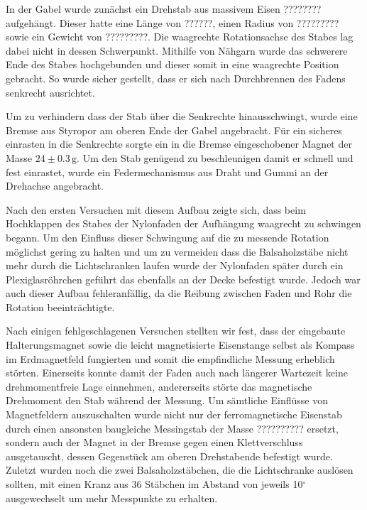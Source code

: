 \documentclass[11pt]{scrartcl}
\newcommand{\unit}[1]{\ensuremath{\,\mathrm{#1}}} %
\begin{document}
In der Gabel wurde zun\"achst ein Drehstab aus massivem Eisen ???????? aufgeh\"angt. Dieser hatte eine L\"ange von ??????, einen Radius von ????????? sowie ein Gewicht von ?????????. Die waagrechte Rotationsachse des Stabes lag dabei nicht in dessen Schwerpunkt. Mithilfe von N\"ahgarn wurde das schwerere Ende des Stabes hochgebunden und dieser somit in eine waagrechte Position gebracht. So wurde sicher gestellt, dass er sich nach Durchbrennen des Fadens senkrecht ausrichtet.

Um zu verhindern dass der Stab \"uber die Senkrechte hinausschwingt, wurde eine Bremse aus Styropor am oberen Ende der Gabel angebracht. F\"ur ein sicheres einrasten in die Senkrechte sorgte ein in die Bremse eingeschobener Magnet der Masse $24 \pm 0.3\unit{g}$. Um den Stab gen\"ugend zu beschleunigen damit er schnell und fest einrastet, wurde ein Federmechanismus aus Draht und Gummi an der Drehachse angebracht. %
%

Nach den ersten Versuchen mit diesem Aufbau zeigte sich, dass beim Hochklappen des Stabes der Nylonfaden der Aufh\"angung waagrecht zu schwingen begann. Um den Einfluss dieser Schwingung auf die zu messende Rotation m\"oglichst gering zu halten und um zu vermeiden dass die Balsaholzst\"abe nicht mehr durch die Lichtschranken laufen wurde der Nylonfaden sp\"ater durch ein Plexiglasr\"ohrchen gef\"uhrt das ebenfalls an der Decke befestigt wurde. Jedoch war auch dieser Aufbau fehleranf\"allig, da die Reibung zwischen Faden und Rohr die Rotation beeintr\"achtigte.

Nach einigen fehlgeschlagenen Versuchen stellten wir fest, dass der eingebaute Halterungsmagnet sowie die leicht magnetisierte Eisenstange selbst als Kompass im Erdmagnetfeld fungierten und somit die empfindliche Messung erheblich störten.
Einerseits konnte damit der Faden auch nach längerer Wartezeit keine drehmomentfreie Lage einnehmen, andererseits störte das magnetische Drehmoment den Stab während der Messung.
Um s\"amtliche Einfl\"usse von Magnetfeldern auszuschalten wurde nicht nur der ferromagnetische Eisenstab durch einen ansonsten baugleiche Messingstab der Masse ?????????? ersetzt, sondern auch der Magnet in der Bremse gegen einen Klettverschluss ausgetauscht, dessen Gegenst\"uck am oberen Drehstabende befestigt wurde. Zuletzt wurden noch die zwei Balsaholzst\"abchen, die die Lichtschranke ausl\"osen sollten, mit einen Kranz aus 36 St\"abchen im Abstand von jeweils 10$^{\circ}$ ausgewechselt um mehr Messpunkte zu erhalten.
\end{document}

